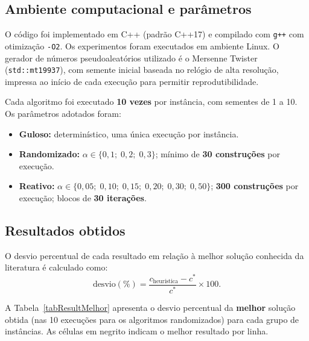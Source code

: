 \documentclass[12pt]{article}
\begin{document}
\subsection{Ambiente computacional e parâmetros}
\label{subSecAmbiente}

O código foi implementado em C++ (padrão C++17) e compilado com \texttt{g++} com otimização \texttt{-O2}. Os experimentos foram executados em ambiente Linux. O gerador de números pseudoaleatórios utilizado é o Mersenne Twister (\texttt{std::mt19937}), com semente inicial baseada no relógio de alta resolução, impressa ao início de cada execução para permitir reprodutibilidade.

Cada algoritmo foi executado \textbf{10 vezes} por instância, com sementes de 1 a 10. Os parâmetros adotados foram:

\begin{itemize}[noitemsep]
    \item \textbf{Guloso:} determinístico, uma única execução por instância.
    \item \textbf{Randomizado:} $\alpha \in \{0{,}1;\; 0{,}2;\; 0{,}3\}$; mínimo de \textbf{30 construções} por execução.
    \item \textbf{Reativo:} $\alpha \in \{0{,}05;\; 0{,}10;\; 0{,}15;\; 0{,}20;\; 0{,}30;\; 0{,}50\}$; \textbf{300 construções} por execução; blocos de \textbf{30 iterações}.
\end{itemize}

\subsection{Resultados obtidos}
\label{subSecResultados}

O desvio percentual de cada resultado em relação à melhor solução conhecida da literatura \cite{ruiz2015} é calculado como:
\begin{equation}
    \text{desvio}(\%) = \frac{c_{\text{heurística}} - c^*}{c^*} \times 100.
\end{equation}

A Tabela~\ref{tabResultMelhor} apresenta o desvio percentual da \textbf{melhor} solução obtida (nas 10 execuções para os algoritmos randomizados) para cada grupo de instâncias. As células em negrito indicam o melhor resultado por linha.
\end{document}
